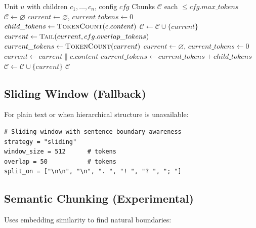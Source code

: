 \begin{algorithm}[H]
\caption{Hierarchical Chunking}
\label{alg:hierarchical-chunk}
\begin{algorithmic}[1]
\Require Unit $u$ with children $c_1, \dots, c_n$, config $cfg$
\Ensure Chunks $\mathcal{C}$ each $\leq cfg.max\_tokens$
\State $\mathcal{C} \gets \varnothing$
\State $current \gets \varnothing$, $current\_tokens \gets 0$
  \State $child\_tokens \gets \textsc{TokenCount}(c.content)$
    \State $\mathcal{C} \gets \mathcal{C} \cup \{current\}$
      \State $current \gets \textsc{Tail}(current, cfg.overlap\_tokens)$
      \State $current\_tokens \gets \textsc{TokenCount}(current)$
    \Else
      \State $current \gets \varnothing$, $current\_tokens \gets 0$
    \EndIf
  \EndIf
  \State $current \gets current \parallel c.content$
  \State $current\_tokens \gets current\_tokens + child\_tokens$
\EndFor
{}
  \State $\mathcal{C} \gets \mathcal{C} \cup \{current\}$
\EndIf
\State \Return $\mathcal{C}$
\end{algorithmic}
\end{algorithm}

\subsection{Sliding Window (Fallback)}
\label{sec:parsing:sliding}

For plain text or when hierarchical structure is unavailable:

\begin{verbatim}
# Sliding window with sentence boundary awareness
strategy = "sliding"
window_size = 512      # tokens
overlap = 50           # tokens
split_on = ["\n\n", "\n", ". ", "! ", "? ", "; "]
\end{verbatim}

\subsection{Semantic Chunking (Experimental)}
\label{sec:parsing:semantic-chunk}

Uses embedding similarity to find natural boundaries:

